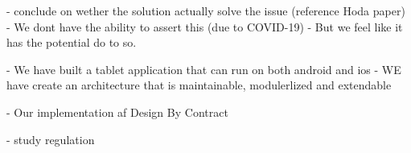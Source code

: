 - conclude on wether the solution actually solve the issue (reference Hoda paper)
    - We dont have the ability to assert this (due to COVID-19)
    - But we feel like it has the potential do to so.

- We have built a tablet application that can run on both android and ios
    - WE have create an architecture that is maintainable, modulerlized and extendable

- Our implementation af Design By Contract

- study regulation

